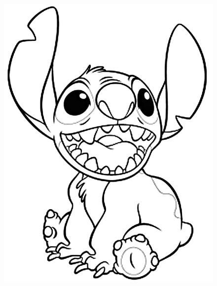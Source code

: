 \documentclass[10pt]{article}
\begin{document}
\begin{figure}

\centering
\begin{minipage}[t]{.49\textwidth}
\centering
\vspace{0pt}
    \includegraphics[scale=0.3]{disney.jpg}
\end{minipage}
\begin{minipage}[t]{.5\textwidth}
\centering
\vspace{0pt}

\end{minipage}
\end{figure}
\end{document}
